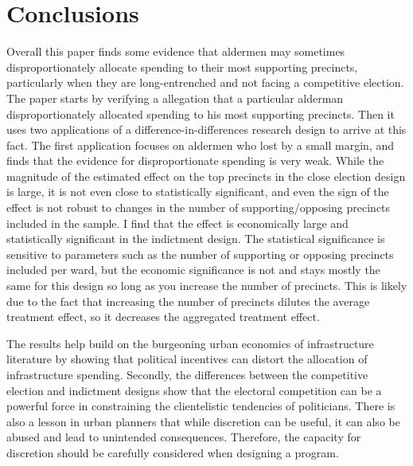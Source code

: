 \section{Conclusions}\label{sec:conclusions}

Overall this paper finds some evidence that aldermen may sometimes disproportionately allocate spending to their most supporting precincts, particularly when they are long-entrenched and not facing a competitive election.
The paper starts by verifying a allegation that a particular alderman disproportionately allocated spending to his most supporting precincts.
Then it uses two applications of a difference-in-differences research design to arrive at this fact.
The first application focuses on aldermen who lost by a small margin, and finds that the evidence for disproportionate spending is very weak.
While the magnitude of the estimated effect on the top precincts in the close election design is large, it is not even close to statistically significant, and even the sign of the effect is not robust to changes in the number of supporting/opposing precincts included in the sample.
I find that the effect is economically large and statistically significant in the indictment design.
The statistical significance is sensitive to parameters such as the number of supporting or opposing precincts included per ward, but the economic significance is not and stays mostly the same for this design so long as you increase the number of precincts.
This is likely due to the fact that increasing the number of precincts dilutes the average treatment effect, so it decreases the aggregated treatment effect.

The results help build on the burgeoning urban economics of infrastructure literature by showing that political incentives can distort the allocation of infrastructure spending.
Secondly, the differences between the competitive election and indictment designs show that the electoral competition can be a powerful force in constraining the clientelistic tendencies of politicians.
There is also a lesson in urban planners that while discretion can be useful, it can also be abused and lead to unintended consequences.
Therefore, the capacity for discretion should be carefully considered when designing a program.
